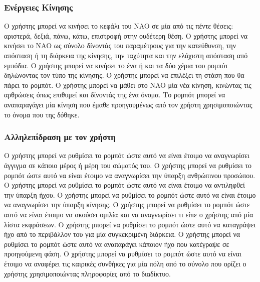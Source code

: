 \subsubsection{Ενέργειες Κίνησης}
\begin{compactitem}
     Ο χρήστης μπορεί να κινήσει το κεφάλι του NAO σε μία από τις πέντε θέσεις: αριστερά, δεξιά, πάνω, κάτω, επιστροφή στην ουδέτερη θέση.
     Ο χρήστης μπορεί να κινήσει το NAO ως σύνολο δίνοντάς του παραμέτρους για την κατεύθυνση, την απόσταση ή τη διάρκεια της κίνησης, την ταχύτητα και την ελάχιστη απόσταση από εμπόδια.
     Ο χρήστης μπορεί να κινήσει το ένα ή και τα δύο χέρια του ρομπότ δηλώνοντας τον τύπο της κίνησης.
     Ο χρήστης μπορεί να επιλέξει τη στάση που θα πάρει το ρομπότ.
     Ο χρήστης μπορεί να μάθει στο NAO μία νέα κίνηση, κινώντας τις αρθρώσεις όπως επιθυμεί και δίνοντάς της ένα όνομα.
     Το ρομπότ μπορεί να αναπαραγάγει μία κίνηση που έμαθε προηγουμένως από τον χρήστη χρησιμοποιώντας το όνομα που της δόθηκε.
\end{compactitem}

\subsubsection{Αλληλεπίδραση με τον χρήστη}
\begin{compactitem}
     Ο χρήστης μπορεί να ρυθμίσει το ρομπότ ώστε αυτό να είναι έτοιμο να αναγνωρίσει άγγιγμα σε κάποιο μέρος ή μέρη του σώματός του.
     Ο χρήστης μπορεί να ρυθμίσει το ρομπότ ώστε αυτό να είναι έτοιμο να αναγνωρίσει την ύπαρξη ανθρώπινου προσώπου.
     Ο χρήστης μπορεί να ρυθμίσει το ρομπότ ώστε αυτό να είναι έτοιμο να αντιληφθεί την ύπαρξη ήχου.
     Ο χρήστης μπορεί να ρυθμίσει το ρομπότ ώστε αυτό να είναι έτοιμο να αναγνωρίσει την ύπαρξη κίνησης.
     Ο χρήστης μπορεί να ρυθμίσει το ρομπότ ώστε αυτό να είναι έτοιμο να ακούσει ομιλία και να αναγνωρίσει τι είπε ο χρήστης από μία λίστα εκφράσεων.
     Ο χρήστης μπορεί να ρυθμίσει το ρομπότ ώστε αυτό να καταγράψει ήχο από το περιβάλλον του για μία συγκεκριμένη διάρκεια.
     Ο χρήστης μπορεί να ρυθμίσει το ρομπότ ώστε αυτό να αναπαράγει κάποιον ήχο που κατέγραψε σε προηγούμενη φάση.
     Ο χρήστης μπορεί να ρυθμίσει το ρομπότ ώστε αυτό να είναι έτοιμο να αναφέρει τις καιρικές συνθήκες για μία πόλη από το σύνολο που ορίζει ο χρήστης χρησιμοποιώντας πληροφορίες από το διαδίκτυο.
\end{compactitem}

